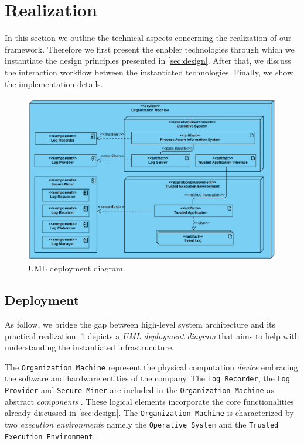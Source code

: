 \section{Realization}
\label{sec:implementation}
In this section we outline the technical aspects concerning the realization of our framework. Therefore we first present the enabler technologies through which we instantiate the design principles presented in \cref{sec:design}. After that, we discuss the interaction workflow between the instantiated technologies. Finally, we show the implementation details.
\begin{figure}[t]
\centering
\includegraphics[width=10 cm]{content/figures/deployment_diagram.pdf}
\caption{UML deployment diagram.}
\label{fig:deployment_diagram}
\end{figure}
\subsection{Deployment}
As follow, we bridge the gap between high-level system architecture and its practical realization. \cref{fig:deployment_diagram} depicts a \textit{UML deployment diagram} \cite{koch2002expressive} that aims to help with understanding the instantiated infrastrucuture. 

The \texttt{Organization Machine} represent the physical computation \textit{device} embracing the software and hardware entities of the company. The \texttt{Log Recorder}, the \texttt{Log Provider} and \texttt{Secure Miner} are included in the \texttt{Organization Machine} as abstract \textit{components} . These logical elements incorporate the core functionalities already discussed in \cref{sec:design}. The \texttt{Organization Machine} is characterized by two \textit{execution environment}s namely the \texttt{Operative System} and the \texttt{Trusted Execution Environment}.

